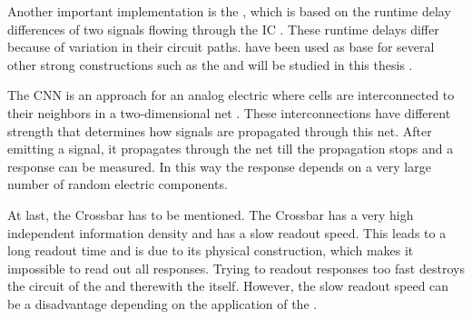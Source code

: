 Another important implementation is the \apuf, which is based on the runtime delay differences of two signals flowing through the \ac{IC}  \cite{Ruhrmair2010StrongProofs}.
These runtime delays differ because of variation in their circuit paths.
\apufs have been used as base for several other strong \puf constructions such as the \xpuf and will be studied in this thesis \cite{Becker2015ThePUFs}.

The \ac{CNN} \puf is an approach for an analog electric \puf where cells are interconnected to their neighbors in a two-dimensional net \cite{Csaba2010ApplicationCryptography}.
These interconnections have different strength that determines how signals are propagated through this net.
After emitting a signal, it propagates through the net till the propagation stops and a response can be measured.
In this way the response depends on a very large number of random electric components.

At last, the Crossbar \puf has to be mentioned.
The Crossbar \puf has a very high independent information density and has a slow readout speed.
This leads to a long readout time and is due to its physical construction, which makes it impossible to read out all responses. 
Trying to readout responses too fast destroys the circuit of the \puf and therewith the \puf itself.
However, the slow readout speed can be a disadvantage depending on the application of the \puf \cite{Ruhrmair2010StrongProofs}.


